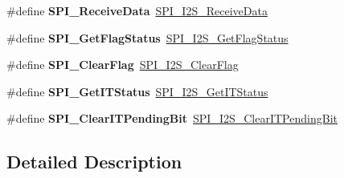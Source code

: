 \begin{DoxyCompactItemize}
\item 
\hypertarget{group___s_p_i___i2_s___legacy_ga62c3f7d78506b029ebb1845342e5bc05}{}\#define {\bfseries S\+P\+I\+\_\+\+Receive\+Data}~\hyperlink{group___s_p_i_gab77de76547f3bff403236b263b070a30}{S\+P\+I\+\_\+\+I2\+S\+\_\+\+Receive\+Data}\label{group___s_p_i___i2_s___legacy_ga62c3f7d78506b029ebb1845342e5bc05}

\item 
\hypertarget{group___s_p_i___i2_s___legacy_ga188075bf183b67201651e20b227fe7a7}{}\#define {\bfseries S\+P\+I\+\_\+\+Get\+Flag\+Status}~\hyperlink{group___s_p_i_ga1bd785d129e09c5734a876c8f2767204}{S\+P\+I\+\_\+\+I2\+S\+\_\+\+Get\+Flag\+Status}\label{group___s_p_i___i2_s___legacy_ga188075bf183b67201651e20b227fe7a7}

\item 
\hypertarget{group___s_p_i___i2_s___legacy_ga9fde1f0c2f8d9f5690fe3d058d16ed5c}{}\#define {\bfseries S\+P\+I\+\_\+\+Clear\+Flag}~\hyperlink{group___s_p_i_ga3aabd9e2437e213056c0ed9bdfa1a724}{S\+P\+I\+\_\+\+I2\+S\+\_\+\+Clear\+Flag}\label{group___s_p_i___i2_s___legacy_ga9fde1f0c2f8d9f5690fe3d058d16ed5c}

\item 
\hypertarget{group___s_p_i___i2_s___legacy_ga4ebfa18a880b0eec4142e74cad021dd9}{}\#define {\bfseries S\+P\+I\+\_\+\+Get\+I\+T\+Status}~\hyperlink{group___s_p_i_ga72decbc1cd79f8fad92a2204beca6bc5}{S\+P\+I\+\_\+\+I2\+S\+\_\+\+Get\+I\+T\+Status}\label{group___s_p_i___i2_s___legacy_ga4ebfa18a880b0eec4142e74cad021dd9}

\item 
\hypertarget{group___s_p_i___i2_s___legacy_gab5f0a306ab6c4dc0775314f367fe935e}{}\#define {\bfseries S\+P\+I\+\_\+\+Clear\+I\+T\+Pending\+Bit}~\hyperlink{group___s_p_i_ga35a524a49ff3d058137060f751e8749f}{S\+P\+I\+\_\+\+I2\+S\+\_\+\+Clear\+I\+T\+Pending\+Bit}\label{group___s_p_i___i2_s___legacy_gab5f0a306ab6c4dc0775314f367fe935e}

\end{DoxyCompactItemize}


\subsection{Detailed Description}
